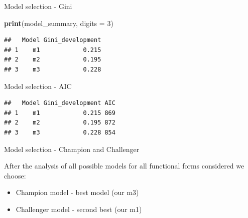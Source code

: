 \documentclass[9pt,ignorenonframetext,]{beamer}
\newenvironment{Shaded}{\begin{snugshade}}{\end{snugshade}}
\newcommand{\KeywordTok}[1]{\textcolor[rgb]{0.13,0.29,0.53}{\textbf{#1}}}
\newcommand{\DataTypeTok}[1]{\textcolor[rgb]{0.13,0.29,0.53}{#1}}
\newcommand{\DecValTok}[1]{\textcolor[rgb]{0.00,0.00,0.81}{#1}}
\newcommand{\StringTok}[1]{\textcolor[rgb]{0.31,0.60,0.02}{#1}}
\newcommand{\OperatorTok}[1]{\textcolor[rgb]{0.81,0.36,0.00}{\textbf{#1}}}
\newcommand{\NormalTok}[1]{#1}
\providecommand{\tightlist}{%
  \setlength{\itemsep}{0pt}\setlength{\parskip}{0pt}}
\begin{document}
\begin{frame}[fragile]{Model selection - Gini}

\begin{Shaded}
\begin{Highlighting}[]
\KeywordTok{print}\NormalTok{(model_summary, }\DataTypeTok{digits =} \DecValTok{3}\NormalTok{)}
\end{Highlighting}
\end{Shaded}

\begin{verbatim}
##   Model Gini_development
## 1    m1            0.215
## 2    m2            0.195
## 3    m3            0.228
\end{verbatim}

\end{frame}

\begin{frame}[fragile]{Model selection - AIC}

\begin{Shaded}
\end{Shaded}

\begin{verbatim}
##   Model Gini_development AIC
## 1    m1            0.215 869
## 2    m2            0.195 872
## 3    m3            0.228 854
\end{verbatim}

\end{frame}

\begin{frame}{Model selection - Champion and Challenger}

After the analysis of all possible models for all functional forms
considered we choose:

\begin{itemize}
\tightlist
\item
  Champion model - best model (our m3)
\item
  Challenger model - second best (our m1)
\end{itemize}

\end{frame}
\end{document}
